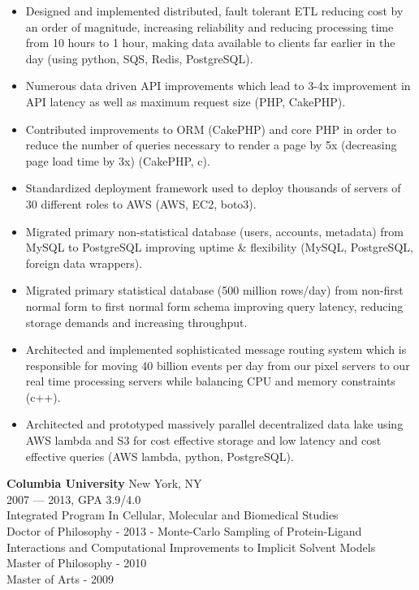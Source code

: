 \begin{itemize}[topsep=1ex, partopsep=0ex, parsep=0ex, itemsep=0.5ex]
    \item Designed and implemented distributed, fault tolerant ETL reducing cost by an order of magnitude, increasing reliability and reducing processing time from {\mytilde}10 hours to {\mytilde}1 hour, making data available to clients far earlier in the day (using python, SQS, Redis, PostgreSQL).
    \item Numerous data driven API improvements which lead to 3-4x improvement in API latency as well as maximum request size (PHP, CakePHP).
    \item Contributed improvements to ORM (CakePHP) and core PHP in order to reduce the number of queries necessary to render a page by 5x (decreasing page load time by {\mytilde}3x) (CakePHP, c).
    \item Standardized deployment framework used to deploy thousands of servers of {\mytilde}30 different roles to AWS (AWS, EC2, boto3).
    \item Migrated primary non-statistical database (users, accounts, metadata) from MySQL to PostgreSQL improving uptime \& flexibility (MySQL, PostgreSQL, foreign data wrappers).
    \item Migrated primary statistical database (500 million rows/day) from non-first normal form to first normal form schema improving query latency, reducing storage demands and increasing throughput.
    \item Architected and implemented sophisticated message routing system which is responsible for moving {\mytilde}40 billion events per day from our pixel servers to our real time processing servers while balancing CPU and memory constraints (c++).
    \item Architected and prototyped massively parallel decentralized data lake using AWS lambda and S3 for cost effective storage and low latency and cost effective queries (AWS lambda, python, PostgreSQL).
\end{itemize}

\vspace{\littleskip}


\myfontsize{\bigheader}
\textbf{Columbia University}
\myfontsize{\bodysize}
New York, NY\\
2007 --- 2013, GPA 3.9/4.0\\
Integrated Program In Cellular, Molecular and Biomedical Studies\\
Doctor of Philosophy - 2013 - Monte-Carlo Sampling of Protein-Ligand Interactions and Computational Improvements to Implicit Solvent Models\\
Master of Philosophy - 2010\\
Master of Arts - 2009\\

